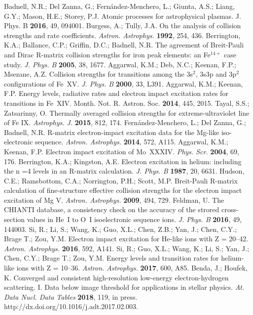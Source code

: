 \documentclass[fleqn]{article}
\begin{document}
\begin{thebibliography}{999}
 Badnell, N.R.;  Del Zanna, G.;   Fern{\'a}ndez-Menchero, L.;  Giunta, A.S.; Liang, G.Y.;  Mason, H.E.; Storey, P.J.  Atomic processes for astrophysical plasmas. J. Phys. B {\bf 2016},  49, 094001.
 Burgess, A.; Tully, J.A. On the analysis of collision strengths and rate coefficients.  {\em Astron. Astrophys.} {\bf 1992}, 254, 436.
 Berrington, K.A.; Ballance, C.P.; Griffin, D.C.; Badnell, N.R. The agreement  of Breit-Pauli and Dirac R-matrix  collision strengths for iron peak elements: an Fe$^{14+}$ case study. {\em J. Phys. B}  {\bf 2005}, 38, 1677.
 Aggarwal, K.M.; Deb, N.C.; Keenan, F.P.; Msezane, A.Z.   Collision strengths for transitions among the 3s$^2$, 3s3p and 3p$^2$ configurations of Fe~XV. {\em J. Phys. B}  {\bf 2000}, 33, L391.
 Aggarwal, K.M.;  Keenan, F.P.  Energy levels, radiative rates and electron impact excitation rates for transitions in Fe~XIV.   Month. Not. R. Astron. Soc. {\bf 2014},  445, 2015. 
 Tayal, S.S.; Zatsarinny, O. Thermally averaged collision strengths for extreme-ultraviolet line of Fe IX. {\em Astrophys. J.} {\bf 2015}, 812, 174.
 Fern{\'a}ndez-Menchero, L.;  Del Zanna, G.;  Badnell, N.R. R-matrix electron-impact excitation data for the Mg-like iso-electronic sequence.  {\em Astron. Astrophys.} {\bf 2014}, 572, A115.
 Aggarwal, K.M.;  Keenan, F.P.  Electron impact excitation of Mo~XXXIV.  {\em Phys. Scr.}  {\bf 2004},   69, 176.
 Berrington, K.A.; Kingston, A.E. Electron excitation in helium:  including  the n =4 levels in an R-matrix calculation. {\em J. Phys. B}  {\bf 1987}, 20, 6631.
 Hudson, C.E.;  Ramsbottom, C.A.;  Norrington, P.H.;  Scott, M.P.  Breit-Pauli R-matrix calculation of fine-structure effective collision strengths for the electron impact excitation of Mg V. {\em Astron. Astrophys.}  {\bf 2009}, 494, 729.
 Feldman, U. The CHIANTI database, a consistency check on the accuracy of the strored cross-section values in He~I to O~I isoelectronic sequence ions. {\em J. Phys. B}  {\bf 2016}, 49, 144003.
 Si, R.; Li, S.; Wang, K.; Guo, X.L.; Chen, Z.B.; Yan, J.; Chen, C.Y.; Brage T.; Zou, Y.M.  Electron impact excitation for He-like ions with Z = 20--42. {\em Astron. Astrophys.} {\bf 2016}, 592, A141. 
 Si, R.;  Guo, X.L.;  Wang, K.; Li, S.;  Yan, J.; Chen, C.Y.; Brage T.; Zou, Y.M.  Energy levels and transition rates for helium-like ions with Z = 10--36. {\em Astron. Astrophys.} {\bf 2017}, 600, A85. 
 Benda, J.; Houfek, K.   Converged and consistent high-resolution low-energy electron-hydrogen scattering. I. Data below image threshold for applications in stellar physics. {\em At. Data Nucl. Data Tables}  {\bf 2018}, 119, in press. http://dx.doi.org/10.1016/j.adt.2017.02.003.

\end{thebibliography}
\end{document}
